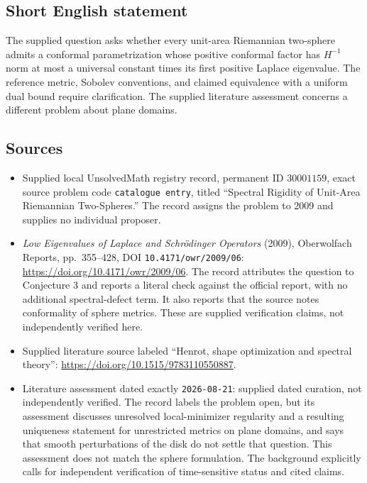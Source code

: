 \documentclass[11pt]{article}
\begin{document}
\subsection{Short English statement}
The supplied question asks whether every unit-area Riemannian two-sphere admits a conformal parametrization whose positive conformal factor has \(H^{-1}\) norm at most a universal constant times its first positive Laplace eigenvalue. The reference metric, Sobolev conventions, and claimed equivalence with a uniform dual bound require clarification. The supplied literature assessment concerns a different problem about plane domains.
\subsection{Sources}
\begin{itemize}
\item Supplied local UnsolvedMath registry record, permanent ID \(30001159\), exact source problem code \texttt{catalogue entry}, titled ``Spectral Rigidity of Unit-Area Riemannian Two-Spheres.'' The record assigns the problem to 2009 and supplies no individual proposer.
\item \emph{Low Eigenvalues of Laplace and Schrödinger Operators} (2009), Oberwolfach Reports, pp.\ 355--428, DOI \texttt{10.4171/owr/2009/06}: \url{https://doi.org/10.4171/owr/2009/06}. The record attributes the question to Conjecture 3 and reports a literal check against the official report, with no additional spectral-defect term. It also reports that the source notes conformality of sphere metrics. These are supplied verification claims, not independently verified here.
\item Supplied literature source labeled ``Henrot, shape optimization and spectral theory'': \url{https://doi.org/10.1515/9783110550887}.
\item Literature assessment dated exactly \texttt{2026-08-21}: supplied dated curation, not independently verified. The record labels the problem open, but its assessment discusses unresolved local-minimizer regularity and a resulting uniqueness statement for unrestricted metrics on plane domains, and says that smooth perturbations of the disk do not settle that question. This assessment does not match the sphere formulation. The background explicitly calls for independent verification of time-sensitive status and cited claims.
\end{itemize}
\end{document}

